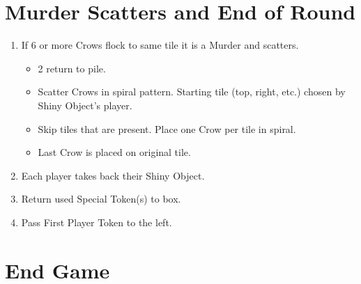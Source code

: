\documentclass[12pt]{article}
\newenvironment{enumerateCustom}
{\begin{enumerate}
  \setlength{\itemsep}{1pt}
  \setlength{\parskip}{0pt}
  \setlength{\parsep}{0pt}}
{\end{enumerate}}
\newenvironment{itemizeCustom}
{\begin{itemize}
  \setlength{\itemsep}{1pt}
  \setlength{\parskip}{0pt}
  \setlength{\parsep}{0pt}}
{\end{itemize}}
\begin{document}
\begin{mdframed}[style = customFrame]
\begin{multicols*}{2}
\section*{Murder Scatters and End of Round}
\begin{enumerateCustom}
	\item If 6 or more Crows flock to same tile it is a Murder and scatters.
		\begin{itemizeCustom}
			\item 2 return to pile.
			\item Scatter Crows in spiral pattern. Starting tile (top, right, etc.) chosen by Shiny Object's player.
			\item Skip tiles that are present. Place one Crow per tile in spiral.
			\item Last Crow is placed on original tile.
		\end{itemizeCustom}
	\item Each player takes back their Shiny Object.
	\item Return used Special Token(s) to box.
	\item Pass First Player Token to the left.
\end{enumerateCustom}

\section*{End Game}

\end{multicols*}
\end{mdframed}
\end{document}
